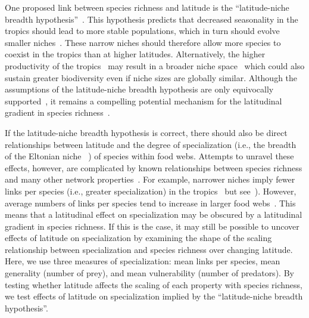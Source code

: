 \documentclass[12pt]{article}
\begin{document}
\begin{spacing}{1.0}


  One proposed link between species richness and latitude is the ``latitude-niche breadth hypothesis''~\citep{Vazquez2004}. 
  This hypothesis predicts that decreased seasonality in the tropics should lead to more stable populations, which in
  turn should evolve smaller niches~\citep{Vazquez2004}. These narrow niches should therefore allow more species to 
  coexist in the tropics than at higher latitudes. Alternatively, the higher productivity of the tropics~\citep{Brown2004}
  may result in a broader niche space~\citep{Davies2007} which could also sustain greater biodiversity even if niche 
  sizes are globally similar. Although the assumptions of the latitude-niche breadth hypothesis are only equivocally 
  supported~\citep{Vazquez2004}, it remains a compelling potential mechanism for the latitudinal gradient in species 
  richness~\citep{Lappalainen2006,Krasnov2008,Slove2010}. 


  If the latitude-niche breadth hypothesis is correct, there should also be direct relationships between latitude and the
  degree of specialization (i.e., the breadth of the Eltonian niche ~\citep{Elton1927}) of species within food webs.
  Attempts to unravel these effects, however,
  are complicated by known relationships between species richness and many other network properties~\citep{Riede2010}. 
  For example,
  narrower niches imply fewer links per species (i.e., greater specialization) in the tropics~\citep{Dyer2007,Marra1997}
  but see~\citep{Schleuning2012}). However,
  average numbers of links per species tend to increase in larger food webs~\citep{Dunne2006,Riede2010}. This means
  that a latitudinal effect on specialization may be obscured by a latitudinal gradient in species richness. If this is
  the case, it may still be possible to uncover effects of latitude on specialization by examining the shape of the scaling 
  relationship between specialization and species richness over changing latitude. Here, we use three measures of specialization:
  mean links per species, mean generality (number of prey), and mean vulnerability (number of predators). By testing whether
  latitude affects the scaling of each property with species richness, we test effects of latitude on specialization implied by
  the ``latitude-niche breadth hypothesis''.



\end{spacing}
\end{document}
